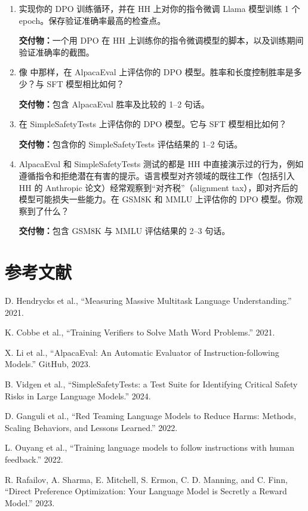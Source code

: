 \begin{enumerate}[label=(\alph*)]
  \item 实现你的 DPO 训练循环，并在 HH 上对你的指令微调 Llama 模型训练 1 个 epoch。保存验证准确率最高的检查点。

  \textbf{交付物：}一个用 DPO 在 HH 上训练你的指令微调模型的脚本，以及训练期间验证准确率的截图。
  \item 像  中那样，在 AlpacaEval 上评估你的 DPO 模型。胜率和长度控制胜率是多少？与 SFT 模型相比如何？

  \textbf{交付物：}包含 AlpacaEval 胜率及比较的 1--2 句话。
  \item 在 SimpleSafetyTests 上评估你的 DPO 模型。它与 SFT 模型相比如何？

  \textbf{交付物：}包含你的 SimpleSafetyTests 评估结果的 1--2 句话。
  \item AlpacaEval 和 SimpleSafetyTests 测试的都是 HH 中直接演示过的行为，例如遵循指令和拒绝潜在有害的提示。语言模型对齐领域的既往工作（包括引入 HH 的 Anthropic 论文）经常观察到“对齐税”（alignment tax），即对齐后的模型可能损失一些能力。在 GSM8K 和 MMLU 上评估你的 DPO 模型。你观察到了什么？

  \textbf{交付物：}包含 GSM8K 与 MMLU 评估结果的 2--3 句话。
\end{enumerate}

\section*{参考文献}

\begin{enumerate}[label={[\arabic*]}]
  \item D. Hendrycks et al., ``Measuring Massive Multitask Language Understanding.'' 2021.
  \item K. Cobbe et al., ``Training Verifiers to Solve Math Word Problems.'' 2021.
  \item X. Li et al., ``AlpacaEval: An Automatic Evaluator of Instruction-following Models.'' GitHub, 2023.
  \item B. Vidgen et al., ``SimpleSafetyTests: a Test Suite for Identifying Critical Safety Risks in Large Language Models.'' 2024.
  \item D. Ganguli et al., ``Red Teaming Language Models to Reduce Harms: Methods, Scaling Behaviors, and Lessons Learned.'' 2022.
  \item L. Ouyang et al., ``Training language models to follow instructions with human feedback.'' 2022.
  \item R. Rafailov, A. Sharma, E. Mitchell, S. Ermon, C. D. Manning, and C. Finn, ``Direct Preference Optimization: Your Language Model is Secretly a Reward Model.'' 2023.
\end{enumerate}
